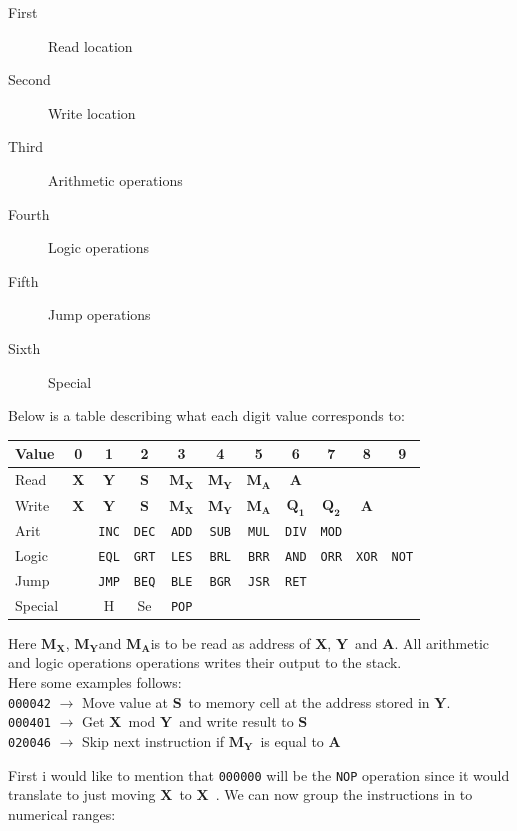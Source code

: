 \documentclass{article}
\newcommand{\V}{\verb}
\newcommand{\x}{$\textbf{X}$}
\newcommand{\y}{$\textbf{Y}$}
\newcommand{\s}{$\textbf{S}$}
\newcommand{\A}{$\textbf{A}$}
\newcommand{\mx}{$\textbf{M}_{\textbf{X}}$}
\newcommand{\my}{$\textbf{M}_{\textbf{Y}}$}
\newcommand{\ma}{$\textbf{M}_{\textbf{A}}$}
\newcommand{\q}{$\textbf{Q}_{\textbf{1}}$}
\newcommand{\qq}{$\textbf{Q}_{\textbf{2}}$}
\begin{document}
\begin{description}
  \item[First] Read location
  \item[Second] Write location
  \item[Third] Arithmetic operations
  \item[Fourth] Logic operations
  \item[Fifth] Jump operations
  \item[Sixth] Special
\end{description}
Below is a table describing what each digit value corresponds to:
\begin{center}
\begin{tabular}{l || *{10}{c |}}
Value & 0 & 1 & 2 & 3 & 4 & 5 & 6 & 7 & 8 & 9 \\
\hline
Read & \x & \y & \s  &\mx & \my & \ma & \A & & & \\

Write & \x & \y & \s  &\mx & \my & \ma & \q& \qq & \A &\\

Arit &  & \V+INC+ & \V+DEC+ & \V+ADD+ & \V+SUB+ & \V+MUL+ & \V+DIV+ & \V+MOD+  & 
&
\\

Logic &  &  \V+EQL+ & \V+GRT+ & \V+LES+ & \V+BRL+ & \V+BRR+ & \V+AND+ & \V+ORR+
& \V+XOR+ & \V+NOT+\\

Jump & & \V+JMP+ & \V+BEQ+ & \V+BLE+ & \V+BGR+ & \V+JSR+ & \V+RET+ & & & \\

Special & & H & Se & \V+POP+ &  &  &  &  &  &  \\	
\end{tabular}
\end{center}
Here \mx , \my and \ma is to be read as address of \x , \y \ and \A.  All
arithmetic and logic operations operations writes their output to the stack.\\
Here some examples follows:\\
\verb+000042+ $\rightarrow$ Move value at \s \ to memory cell at the address
stored in \y. \\
\verb+000401+ $\rightarrow$ Get \x \ mod \y \ and write result to \s \\
\verb+020046+ $\rightarrow$ Skip next instruction if \my \ is equal to \A \\
\newpage

First i would like to  mention that
\verb+000000+ will be the \verb+NOP+ operation since it would translate to just
moving \x \ to \x \ . 
We can now group the instructions in to numerical ranges:
\end{document}
